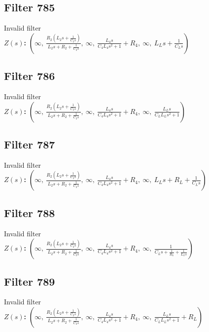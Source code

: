 \documentclass{article}
\begin{document}
\subsection*{Filter 785}
Invalid filter \\ 
\textbf{$Z(s)$:} $\left( \infty, \  \frac{R_{2} \left(L_{2} s + \frac{1}{C_{2} s}\right)}{L_{2} s + R_{2} + \frac{1}{C_{2} s}}, \  \infty, \  \frac{L_{4} s}{C_{4} L_{4} s^{2} + 1} + R_{4}, \  \infty, \  L_{L} s + \frac{1}{C_{L} s}\right)$ \\ 
\subsection*{Filter 786}
Invalid filter \\ 
\textbf{$Z(s)$:} $\left( \infty, \  \frac{R_{2} \left(L_{2} s + \frac{1}{C_{2} s}\right)}{L_{2} s + R_{2} + \frac{1}{C_{2} s}}, \  \infty, \  \frac{L_{4} s}{C_{4} L_{4} s^{2} + 1} + R_{4}, \  \infty, \  \frac{L_{L} s}{C_{L} L_{L} s^{2} + 1}\right)$ \\ 
\subsection*{Filter 787}
Invalid filter \\ 
\textbf{$Z(s)$:} $\left( \infty, \  \frac{R_{2} \left(L_{2} s + \frac{1}{C_{2} s}\right)}{L_{2} s + R_{2} + \frac{1}{C_{2} s}}, \  \infty, \  \frac{L_{4} s}{C_{4} L_{4} s^{2} + 1} + R_{4}, \  \infty, \  L_{L} s + R_{L} + \frac{1}{C_{L} s}\right)$ \\ 
\subsection*{Filter 788}
Invalid filter \\ 
\textbf{$Z(s)$:} $\left( \infty, \  \frac{R_{2} \left(L_{2} s + \frac{1}{C_{2} s}\right)}{L_{2} s + R_{2} + \frac{1}{C_{2} s}}, \  \infty, \  \frac{L_{4} s}{C_{4} L_{4} s^{2} + 1} + R_{4}, \  \infty, \  \frac{1}{C_{L} s + \frac{1}{R_{L}} + \frac{1}{L_{L} s}}\right)$ \\ 
\subsection*{Filter 789}
Invalid filter \\ 
\textbf{$Z(s)$:} $\left( \infty, \  \frac{R_{2} \left(L_{2} s + \frac{1}{C_{2} s}\right)}{L_{2} s + R_{2} + \frac{1}{C_{2} s}}, \  \infty, \  \frac{L_{4} s}{C_{4} L_{4} s^{2} + 1} + R_{4}, \  \infty, \  \frac{L_{L} s}{C_{L} L_{L} s^{2} + 1} + R_{L}\right)$ \\ 
\end{document}

